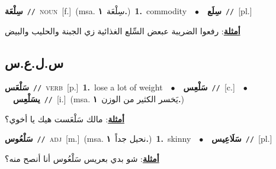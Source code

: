 \documentclass[10pt,a4paper,twoside]{article} %
\begin{document}
\begin{multicols}{2}
{\setlength\topsep{0pt}\textbf{\foreignlanguage{arabic}{سِلْعَة}}\ {\color{gray}\texttt{//}\color{black}}\ \textsc{noun}\ [f.]\ \color{gray}(msa. \foreignlanguage{arabic}{سِلْعَة}~\foreignlanguage{arabic}{\textbf{١.}})\color{black}\ \textbf{1.}~commodity\ \ $\bullet$\ \ \setlength\topsep{0pt}\textbf{\foreignlanguage{arabic}{سِلَع}}\ {\color{gray}\texttt{//}\color{black}}\ [pl.]\  \begin{flushright}\color{gray}\foreignlanguage{arabic}{\textbf{\underline{\foreignlanguage{arabic}{أمثلة}}}: رفعوا الضريبة عبعض السِّلع الغذائية زي الجبنة والحليب والبيض}\end{flushright}\color{black}} \vspace{2mm}

\vspace{-3mm}
\subsection*{\color{blue}\foreignlanguage{arabic}{س.ل.ع.س}\color{blue}{}} 

{\setlength\topsep{0pt}\textbf{\foreignlanguage{arabic}{سَلْعَس}}\ {\color{gray}\texttt{//}\color{black}}\ \textsc{verb}\ [p.]\ \textbf{1.}~lose a lot of weight\ \ $\bullet$\ \ \setlength\topsep{0pt}\textbf{\foreignlanguage{arabic}{سَلْعِس}}\ {\color{gray}\texttt{//}\color{black}}\ [c.]\ \ $\bullet$\ \ \setlength\topsep{0pt}\textbf{\foreignlanguage{arabic}{يسَلْعِس}}\ {\color{gray}\texttt{//}\color{black}}\ [i.]\ \color{gray}(msa. \foreignlanguage{arabic}{يَخسر الكثير من الوزن}~\foreignlanguage{arabic}{\textbf{١.}})\color{black}\  \begin{flushright}\color{gray}\foreignlanguage{arabic}{\textbf{\underline{\foreignlanguage{arabic}{أمثلة}}}: مالك سَلْعَست هيك يا أخوي؟}\end{flushright}\color{black}} \vspace{2mm}

{\setlength\topsep{0pt}\textbf{\foreignlanguage{arabic}{سَلْعُوس}}\ {\color{gray}\texttt{//}\color{black}}\ \textsc{adj}\ [m.]\ \color{gray}(msa. \foreignlanguage{arabic}{نحيل جداً}~\foreignlanguage{arabic}{\textbf{١.}})\color{black}\ \textbf{1.}~skinny\ \ $\bullet$\ \ \setlength\topsep{0pt}\textbf{\foreignlanguage{arabic}{سَلَاعِيس}}\ {\color{gray}\texttt{//}\color{black}}\ [pl.]\  \begin{flushright}\color{gray}\foreignlanguage{arabic}{\textbf{\underline{\foreignlanguage{arabic}{أمثلة}}}: شو بدي بعريس سَلْعُوس أنا أنصح منه؟}\end{flushright}\color{black}} \vspace{2mm}


\end{multicols}
\end{document}
